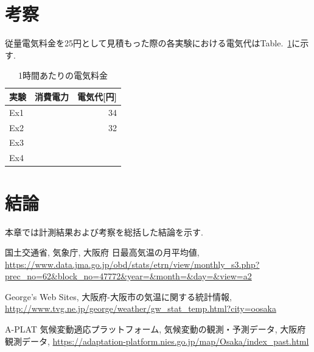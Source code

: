 \documentclass[a4j,fleqn,dvipdfmx,uplatex]{jsarticle}
\newcommand{\tableref}[1]{Table.\ \ref{#1}}
\begin{document}
\section{考察}
従量電気料金を25円として見積もった際の各実験における電気代は\tableref{table:electric_bill}に示す. 

\begin{table}[htb]
  \caption{1時間あたりの電気料金}
  \label{table:electric_bill}
  \centering
  \begin{tabular}{lrr}
    実験 & 消費電力 & 電気代[円] \\
    \hline \hline
    Ex1 &  & 34 \\
    Ex2 &  & 32 \\
    Ex3 &  &  \\
    Ex4 &  &  \\
    \hline
  \end{tabular}
\end{table}

\section{結論}
本章では計測結果および考察を総括した結論を示す. 

\begin{thebibliography}{99}
国土交通省, 気象庁, 大阪府 日最高気温の月平均値, 
\url{https://www.data.jma.go.jp/obd/stats/etrn/view/monthly_s3.php?prec_no=62&block_no=47772&year=&month=&day=&view=a2}\vspace{2mm}

George's Web Sites, 大阪府-大阪市の気温に関する統計情報, 
\url{http://www.tvg.ne.jp/george/weather/gw_stat_temp.html?city=oosaka}\vspace{2mm}

A-PLAT 気候変動適応プラットフォーム, 気候変動の観測・予測データ, 大阪府観測データ, 
\url{https://adaptation-platform.nies.go.jp/map/Osaka/index_past.html}\vspace{2mm}
\end{thebibliography}
%
%
%
\end{document}
